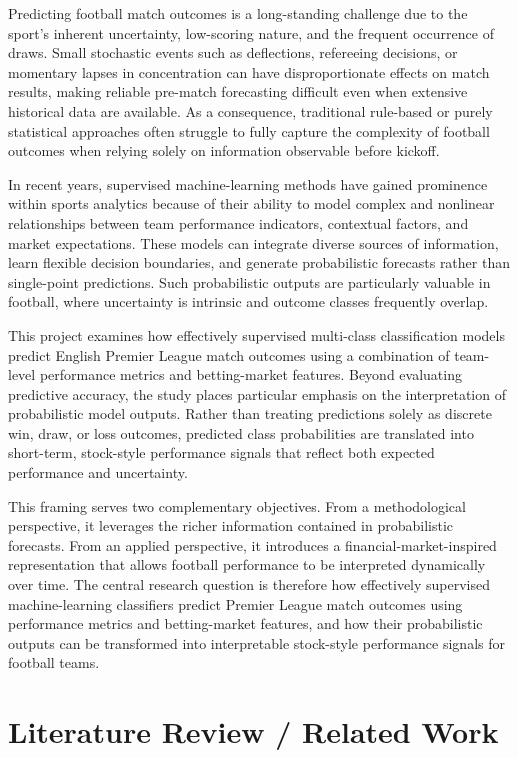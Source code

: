 \documentclass[11pt,a4paper]{article}
\begin{document}
Predicting football match outcomes is a long-standing challenge due to the sport’s inherent uncertainty, low-scoring nature, and the frequent occurrence of draws. Small stochastic events such as deflections, refereeing decisions, or momentary lapses in concentration can have disproportionate effects on match results, making reliable pre-match forecasting difficult even when extensive historical data are available. As a consequence, traditional rule-based or purely statistical approaches often struggle to fully capture the complexity of football outcomes when relying solely on information observable before kickoff.

In recent years, supervised machine-learning methods have gained prominence within sports analytics because of their ability to model complex and nonlinear relationships between team performance indicators, contextual factors, and market expectations. These models can integrate diverse sources of information, learn flexible decision boundaries, and generate probabilistic forecasts rather than single-point predictions. Such probabilistic outputs are particularly valuable in football, where uncertainty is intrinsic and outcome classes frequently overlap.

This project examines how effectively supervised multi-class classification models predict English Premier League match outcomes using a combination of team-level performance metrics and betting-market features. Beyond evaluating predictive accuracy, the study places particular emphasis on the interpretation of probabilistic model outputs. Rather than treating predictions solely as discrete win, draw, or loss outcomes, predicted class probabilities are translated into short-term, stock-style performance signals that reflect both expected performance and uncertainty.

This framing serves two complementary objectives. From a methodological perspective, it leverages the richer information contained in probabilistic forecasts. From an applied perspective, it introduces a financial-market-inspired representation that allows football performance to be interpreted dynamically over time. The central research question is therefore how effectively supervised machine-learning classifiers predict Premier League match outcomes using performance metrics and betting-market features, and how their probabilistic outputs can be transformed into interpretable stock-style performance signals for football teams.


\section{Literature Review / Related Work}
\label{sec:literature}
\end{document}
